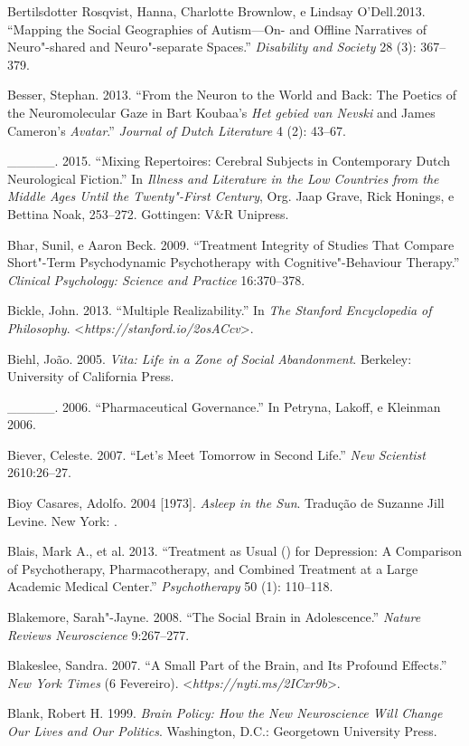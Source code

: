 {\begin{Parskip}
Bertilsdotter Rosqvist, Hanna, Charlotte Brownlow, e Lindsay
O'Dell.2013. ``Mapping the Social Geographies of Autism---On- and
Offline Narratives of Neuro"-shared and Neuro"-separate Spaces.''
\emph{Disability and Society} 28 (3): 367--379.

Besser, Stephan. 2013. ``From the Neuron to the World and Back: The
Poetics of the Neuromolecular Gaze in Bart Koubaa's \emph{Het gebied van
Nevski} and James Cameron's \emph{Avatar}.'' \emph{Journal of Dutch
Literature} 4 (2): 43--67.

\_\_\_\_\_. 2015. ``Mixing Repertoires: Cerebral Subjects in Contemporary
Dutch Neurological Fiction.'' In \emph{Illness and Literature in the Low
Countries from the Middle Ages Until the Twenty"-First Century}, Org.
Jaap Grave, Rick Honings, e Bettina Noak, 253--272. Gottingen: V\&R
Unipress.

Bhar, Sunil, e Aaron Beck. 2009. ``Treatment Integrity of Studies That
Compare Short"-Term Psychodynamic Psychotherapy with Cognitive"-Behaviour
Therapy.'' \emph{Clinical Psychology: Science and Practice} 16:370--378.

Bickle, John. 2013. ``Multiple Realizability.'' In \emph{The Stanford
Encyclopedia of Philosophy}.
\textless{}\emph{https://stanford.io/2osACcv}\textgreater{}.

Biehl, João. 2005. \emph{Vita: Life in a Zone of Social Abandonment}.
Berkeley: University of California Press.

\_\_\_\_\_. 2006. ``Pharmaceutical Governance.'' In Petryna, Lakoff, e
Kleinman 2006.

Biever, Celeste. 2007. ``Let's Meet Tomorrow in Second Life.'' \emph{New
Scientist} 2610:26--27.

Bioy Casares, Adolfo. 2004 {[}1973{]}. \emph{Asleep in the Sun}.
Tradução de Suzanne Jill Levine. New York: .

Blais, Mark A., et al. 2013. ``Treatment as Usual () for Depression:
A Comparison of Psychotherapy, Pharmacotherapy, and Combined Treatment
at a Large Academic Medical Center.'' \emph{Psychotherapy} 50 (1):
110--118.

Blakemore, Sarah"-Jayne. 2008. ``The Social Brain in Adolescence.''
\emph{Nature Reviews Neuroscience} 9:267--277.

Blakeslee, Sandra. 2007. ``A Small Part of the Brain, and Its Profound
Effects.'' \emph{New York Times} (6 Fevereiro).
\textless{}\emph{https://nyti.ms/2ICxr9b}\textgreater{}.

Blank, Robert H. 1999. \emph{Brain Policy: How the New Neuroscience Will
Change Our Lives and Our Politics}. Washington, D.C.: Georgetown
University Press.


\end{Parskip}}
